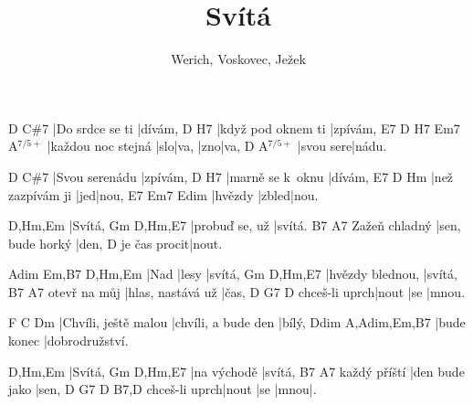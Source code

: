 \documentclass{song}
\title{Svítá}
\author{Werich, Voskovec, Ježek}
\newcommand{\aug}{$^{7/5+}$}
\begin{document}
\begin{multicols}{2}
\strophe
D               C\#7
|Do srdce se ti |dívám,
D                  H7
|když pod oknem ti |zpívám,
E7                 D   H7   Em7 A\aug
|každou noc stejná |slo|va, |zno|va,
D         A\aug
|svou sere|nádu.
\endstrophe

\strophe
D              C\#7
|Svou serenádu |zpívám,
D                H7
|marně se k~oknu |dívám,
E7               D  Hm
|než zazpívám ji |jed|nou,
E7      Em7   Edim
|hvězdy |zbled|nou.
\endstrophe

\strophe
D,Hm,Em
|Svítá,
Gm             D,Hm,E7
|probuď se, už |svítá.
              B7               A7
Zažeň chladný |sen, bude horký |den,
             D
je čas procit|nout.
\endstrophe

\columnbreak

\strophe
Adim Em,B7 D,Hm,Em
|Nad |lesy |svítá,
Gm               D,Hm,E7
|hvězdy blednou, |svítá,
             B7               A7
otevř na můj |hlas, nastává už |čas,
              D     G7 D
chceš-li uprch|nout |se |mnou.
\endstrophe

\strophe
F                   C                    Dm
|Chvíli, ještě malou |chvíli, a bude den |bílý,
Ddim        A,Adim,Em,B7
|bude konec |dobrodružství.
\endstrophe


\strophe
D,Hm,Em
|Svítá,
Gm          D,Hm,E7
|na východě |svítá,
             B7             A7
každý příští |den bude jako |sen,
              D     G7  D    B7,D
chceš-li uprch|nout |se |mnou|.
\endstrophe
\end{multicols}

\end{document}
